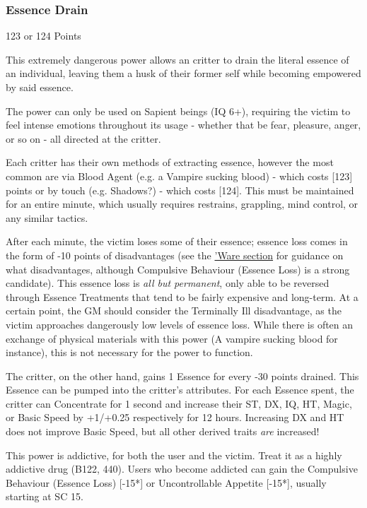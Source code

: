 \begin{multicols*}{3}
	
	\subsubsection{Essence Drain}\label{essence_drain}
	\begin{flushright}
		123 or 124 Points
	\end{flushright}
		
	This extremely dangerous power allows an critter to drain the literal essence of an individual, leaving them a husk of their former self while becoming empowered by said essence.
	
	The power can only be used on Sapient beings (IQ 6+), requiring the victim to feel intense emotions throughout its usage - whether that be fear, pleasure, anger, or so on - all directed at the critter.
	
	Each critter has their own methods of extracting essence, however the most common are via Blood Agent (e.g. a Vampire sucking blood) - which costs [123] points or by touch (e.g. Shadows?) - which costs [124]. This must be maintained for an entire minute, which usually requires restrains, grappling, mind control, or any similar tactics.
	
	After each minute, the victim loses some of their essence; essence loss comes in the form of -10 points of disadvantages (see the \hyperref[ware]{'Ware section} for guidance on what disadvantages, although Compulsive Behaviour (Essence Loss) is a strong candidate). This essence loss is \textit{all but permanent}, only able to be reversed through Essence Treatments that tend to be fairly expensive and long-term. At a certain point, the GM should consider the Terminally Ill disadvantage, as the victim approaches dangerously low levels of essence loss. While there is often an exchange of physical materials with this power (A vampire sucking blood for instance), this is not necessary for the power to function.
	
	The critter, on the other hand, gains 1 Essence for every -30 points drained. This Essence can be pumped into the critter's attributes. For each Essence spent, the critter can Concentrate for 1 second and increase their ST, DX, IQ, HT, Magic, or Basic Speed by +1/+0.25 respectively for 12 hours. Increasing DX and HT does not improve Basic Speed, but all other derived traits \textit{are} increased!
	
	This power is addictive, for both the user and the victim. Treat it as a highly addictive drug (B122, 440). Users who become addicted can gain the Compulsive Behaviour (Essence Loss) [-15*] or Uncontrollable Appetite [-15*], usually starting at SC 15.
	

\end{multicols*}
